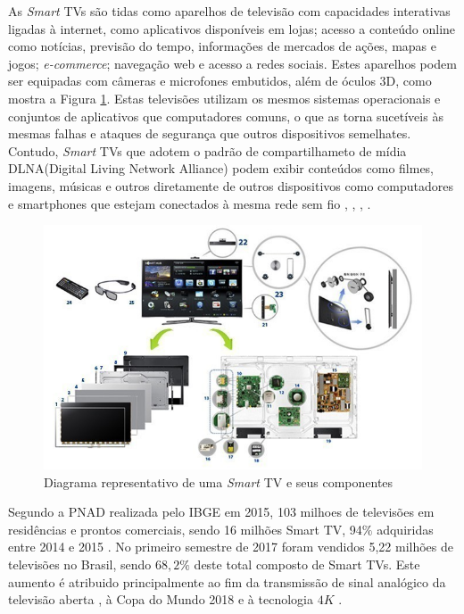 
As \emph{Smart} TVs são tidas como aparelhos de televisão com capacidades interativas ligadas à internet, como aplicativos disponíveis em lojas; acesso a conteúdo online como notícias, previsão do tempo, informações de mercados de ações, mapas e jogos; \emph{e-commerce}; navegação web e acesso a redes sociais. Estes aparelhos podem ser equipadas com câmeras e microfones embutidos, além de óculos 3D, como mostra a Figura \ref{fig:smart_samsung}. Estas televisões utilizam os mesmos sistemas operacionais e conjuntos de aplicativos que computadores comuns, o que as torna sucetíveis às mesmas falhas e ataques de segurança que outros dispositivos semelhates. Contudo, \emph{Smart} TVs que adotem o padrão de compartilhameto de mídia DLNA(Digital Living Network Alliance) podem exibir conteúdos como filmes, imagens, músicas e outros diretamente de outros dispositivos como computadores e smartphones que estejam conectados à mesma rede sem fio \cite{michele2014watch}, \cite{shin2013smart}, \cite{perakakis2015proposed}, \cite{whatisasmarttv}.
\begin{figure}
	\includegraphics[width=\textwidth]{img/smart_samsung.jpg}
	\caption{Diagrama representativo de uma \emph{Smart} TV e seus componentes \cite{samsung:smarttv}}
	\label{fig:smart_samsung}
\end{figure}

Segundo a PNAD realizada pelo IBGE em 2015, 103 milhoes de televisões em residências e prontos comerciais, sendo 16 milhões Smart TV, 94$\%$ adquiridas entre 2014 e 2015 \cite{pnad2015}. No primeiro semestre de 2017 foram vendidos 5,22 milhões de televisões no Brasil, sendo $68,2\%$ deste total composto de Smart TVs. Este aumento é atribuido principalmente ao fim da transmissão de sinal analógico da televisão aberta \cite{leiajabuscasmart}, à Copa do Mundo 2018 e à tecnologia $4K$ \cite{correiopnad}.


